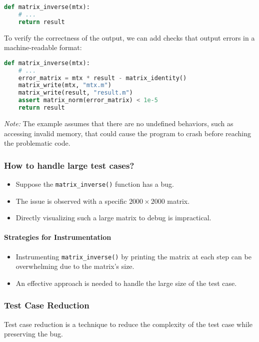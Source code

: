 \documentclass[12pt]{article}
\begin{document}
\begin{lstlisting}[language=Python]
def matrix_inverse(mtx):
    # ...
    return result
\end{lstlisting}

To verify the correctness of the output, we can add checks that output errors in a machine-readable format:

\begin{lstlisting}[language=Python]
def matrix_inverse(mtx):
    # ...
    error_matrix = mtx * result - matrix_identity()
    matrix_write(mtx, "mtx.m")
    matrix_write(result, "result.m")
    assert matrix_norm(error_matrix) < 1e-5
    return result
\end{lstlisting}

\textit{Note:} The example assumes that there are no undefined behaviors, such as accessing invalid memory, that could cause the program to crash before reaching the problematic code.


\subsubsection{How to handle large test cases?}
\begin{itemize}
    \item Suppose the \texttt{matrix\_inverse()} function has a bug.
    \item The issue is observed with a specific \(2000 \times 2000\) matrix.
    \item Directly visualizing such a large matrix to debug is impractical.
\end{itemize}

\paragraph{Strategies for Instrumentation}
\begin{itemize}
    \item Instrumenting \texttt{matrix\_inverse()} by printing the matrix at each step can be overwhelming due to the matrix's size.
    \item An effective approach is needed to handle the large size of the test case.
\end{itemize}

\subsubsection{Test Case Reduction}
Test case reduction is a technique to reduce the complexity of the test case while preserving the bug.\\
\end{document}
